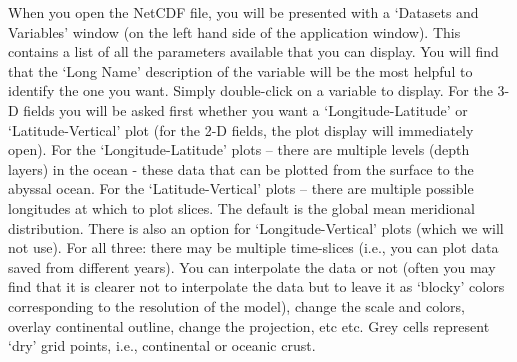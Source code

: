 \documentclass[11pt,fleqn]{book} %
\begin{document}
\noindent When you open the NetCDF file, you will be presented with a ‘\textsf{Datasets and Variables}’ window (on the left hand side of the application window). This contains a list of all the parameters available that you can display. You will find that the ‘\textsf{Long Name}’ description of the variable will be the most helpful to identify the one you want. Simply double-click on a variable to display. For the 3-D fields you will be asked first whether you want a ‘\textsf{Longitude-Latitude}’ or ‘\textsf{Latitude-Vertical}’ plot (for the 2-D fields, the plot display will immediately open).
For the ‘\textsf{Longitude-Latitude}’ plots – there are multiple levels (depth layers) in the ocean - these data that can be plotted from the surface to the abyssal ocean.
For the ‘\textsf{Latitude-Vertical}' plots – there are multiple possible longitudes at which to plot slices. The default is the global mean meridional distribution. 
There is also an option for ‘\textsf{Longitude-Vertical}' plots (which we will not use).
For all three: there may be multiple time-slices (i.e., you can plot data saved from different years).
You can interpolate the data or not (often you may find that it is clearer not to interpolate the data but to leave it as ‘blocky’ colors corresponding to the resolution of the model), change the scale and colors, overlay continental outline, change the projection, etc etc. Grey cells represent ‘dry’ grid points, i.e., continental or oceanic crust.
\end{document}
